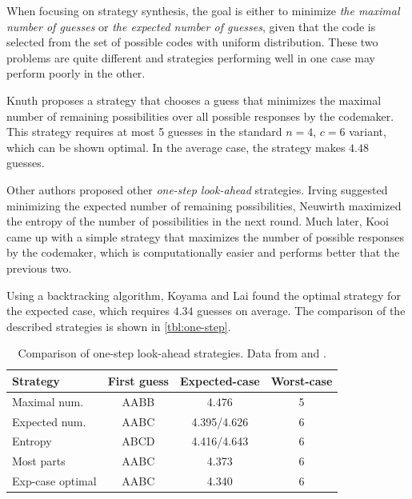 When focusing on strategy synthesis, the goal is either to minimize
  \emph{the maximal number of guesses}
  or \emph{the expected number of guesses}, given that the code
  is selected from the set of possible codes with uniform distribution.
These two problems are quite different and strategies performing well
  in one case may perform poorly in the other.

Knuth\cite{mm-knuth} proposes a strategy that chooses a guess
  that minimizes the maximal number of remaining possibilities over all
  possible responses by the codemaker.
This strategy requires at most 5 guesses in the standard $n=4$, $c=6$ variant,
  which can be shown optimal.
In the average case, the strategy makes $4.48$ guesses.

Other authors proposed other \emph{one-step look-ahead} strategies.
Irving\cite{mm-expnum} suggested minimizing the expected number
  of remaining possibilities,
Neuwirth\cite{mm-entropy} maximized the entropy of the number
  of possibilities in the next round.
Much later, Kooi\cite{mm-mostparts} came up with a simple strategy that
  maximizes the number of possible responses by the codemaker,
  which is computationally easier and performs better that the previous two.

Using a backtracking algorithm, Koyama and Lai\cite{mm-exp-opt} found
  the optimal strategy for the expected case, which requires $4.34$
  guesses on average.
The comparison of the described strategies is shown in \autoref{tbl:one-step}.

\begin{table}[ht]
\begin{center}
\begin{tabular}{|l|c|c|c|}
\hline Strategy & First guess & Expected-case & Worst-case \\ \hline
Maximal num. & AABB & 4.476 & 5 \\ \hline
Expected num. & AABC & 4.395/4.626\footnotemark & 6 \\ \hline
Entropy & ABCD & 4.416/4.643\footnotemark & 6 \\ \hline
Most parts & AABC & 4.373 & 6 \\ \hline
Exp-case optimal & AABC & 4.340 & 6 \\ \hline
\end{tabular}
\caption{Comparison of one-step look-ahead strategies. Data from \cite{mm-ville} and \cite{mm-mostparts}.}
\label{tbl:one-step}
\end{center}
\end{table}
\addtocounter{footnote}{-1}



